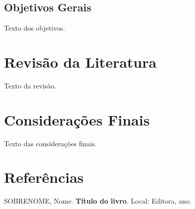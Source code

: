 \documentclass[12pt,a4paper]{article}
\begin{document}
\subsection{Objetivos Gerais}

Texto dos objetivos.

\section{Revisão da Literatura}

Texto da revisão.

\section{Considerações Finais}

Texto das considerações finais.

\section*{Referências}

\singlespacing
\noindent SOBRENOME, Nome. \textbf{Título do livro}. Local: Editora, ano.
\end{document}

